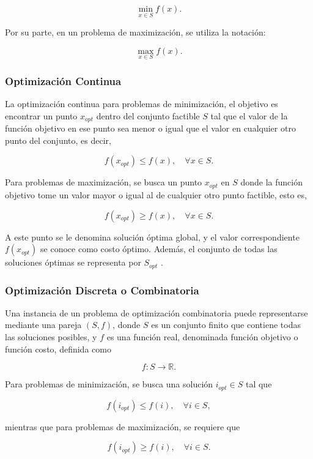 \documentclass[12pt,titlepage,twoside,openright]{book}
\begin{document}
\[
	\min_{x \in S} f(x).
\]

Por su parte, en un problema de maximización, se utiliza la notación:

\[
	\max_{x \in S} f(x).
\]

\citep{cobos2010}


\subsubsection{Optimización Continua}

La optimización continua para problemas de minimización, el objetivo es encontrar un punto \( x_{opt} \) dentro del conjunto factible \( S \) tal que el valor de la función objetivo en ese punto sea menor o igual que el valor en cualquier otro punto del conjunto, es decir,

\[
	f(x_{opt}) \leq f(x), \quad \forall x \in S.
\]

Para problemas de maximización, se busca un punto \( x_{opt} \) en \( S \) donde la función objetivo tome un valor mayor o igual al de cualquier otro punto factible, esto es,

\[
	f(x_{opt}) \geq f(x), \quad \forall x \in S.
\]

A este punto se le denomina solución óptima global, y el valor correspondiente \( f(x_{opt}) \) se conoce como costo óptimo. Además, el conjunto de todas las soluciones óptimas se representa por \( S_{opt} \) \citep{cobos2010}.


\subsubsection{Optimización Discreta o Combinatoria}
\label{subsec:opt_discreta}

Una instancia de un problema de optimización combinatoria puede representarse mediante una pareja \((S, f)\), donde \(S\) es un conjunto finito que contiene todas las soluciones posibles, y \(f\) es una función real, denominada función objetivo o función costo, definida como

\[
	f: S \to \mathbb{R}.
\]

Para problemas de minimización, se busca una solución \(i_{opt} \in S\) tal que

\[
	f(i_{opt}) \leq f(i), \quad \forall i \in S,
\]

mientras que para problemas de maximización, se requiere que

\[
	f(i_{opt}) \geq f(i), \quad \forall i \in S.
\]
\end{document}

